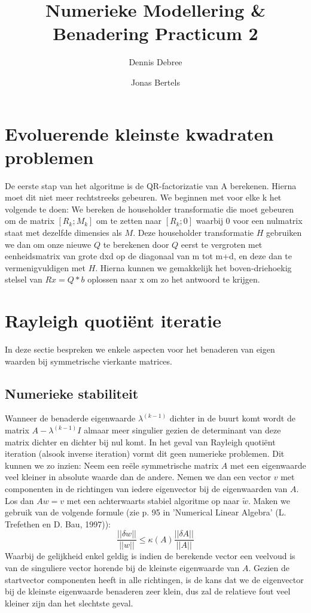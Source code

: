 \documentclass[a4paper]{article}
\title{Numerieke Modellering \& Benadering Practicum 2}
\author{Dennis Debree \and Jonas Bertels}
\begin{document}
\maketitle

\section{Evoluerende kleinste kwadraten problemen}
De eerste stap van het algoritme is de QR-factorizatie van A berekenen. Hierna moet dit niet meer rechtstreeks gebeuren. We beginnen met voor elke k het volgende te doen: We bereken de householder transformatie die moet gebeuren om de matrix $[R_{k}; M_{k}]$ om te zetten naar $[R_{k}; 0]$ waarbij 0 voor een nulmatrix staat met dezelfde dimensies als $M$. Deze householder transformatie $H$ gebruiken we dan om onze nieuwe $Q$ te berekenen door $Q$ eerst te vergroten met eenheidsmatrix van grote dxd op de diagonaal van m tot m+d, en deze dan te vermenigvuldigen met $H$. Hierna kunnen we gemakkelijk het boven-driehoekig stelsel van $Rx = Q*b$ oplossen naar x om zo het antwoord te krijgen.
\section{Rayleigh quotiënt iteratie}
	In deze sectie bespreken we enkele aspecten voor het benaderen van eigen waarden bij symmetrische vierkante matrices.
\subsection{Numerieke stabiliteit}	
	Wanneer de benaderde eigenwaarde $\lambda^{(k-1)}$ dichter in de buurt komt wordt de matrix $A-\lambda^{(k-1)}I$ almaar meer singulier gezien de determinant van deze matrix dichter en dichter bij nul komt.
	In het geval van Rayleigh quotiënt iteration (alsook inverse iteration) vormt dit geen numerieke problemen.
	Dit kunnen we zo inzien:
	Neem een reële symmetrische matrix $A$ met een eigenwaarde veel kleiner in absolute waarde dan de andere.
	Nemen we dan een vector $v$ met componenten in de richtingen van iedere eigenvector bij de eigenwaarden van $A$.
	Los dan $Aw = v$ met een achterwaarts stabiel algoritme op naar $\tilde{w}$.
	Maken we gebruik van de volgende formule (zie p. 95 in 'Numerical Linear Algebra' (L. Trefethen en D. Bau, 1997)):
	\begin{equation}
		\frac{||\delta w||}{||w||}\leq \kappa (A)  \frac{||\delta A||}{||A||}
	\end{equation}
	Waarbij de gelijkheid enkel geldig is indien de berekende vector een veelvoud is van de singuliere vector horende bij de kleinste eigenwaarde van $A$. Gezien de startvector componenten heeft in alle richtingen, is de kans dat we de eigenvector bij de kleinste eigenwaarde benaderen zeer klein, dus zal de relatieve fout veel kleiner zijn dan het slechtste geval.
	\pagebreak
\end{document}
